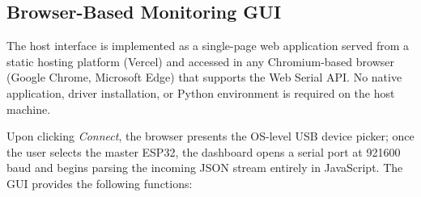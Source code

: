 \subsection{Browser-Based Monitoring GUI}

The host interface is implemented as a single-page web application served from a static hosting platform (Vercel) and accessed in any Chromium-based browser (Google Chrome, Microsoft Edge) that supports the Web Serial API. No native application, driver installation, or Python environment is required on the host machine.

Upon clicking \emph{Connect}, the browser presents the OS-level USB device picker; once the user selects the master ESP32, the dashboard opens a serial port at 921600\,baud and begins parsing the incoming JSON stream entirely in JavaScript. The GUI provides the following functions:

